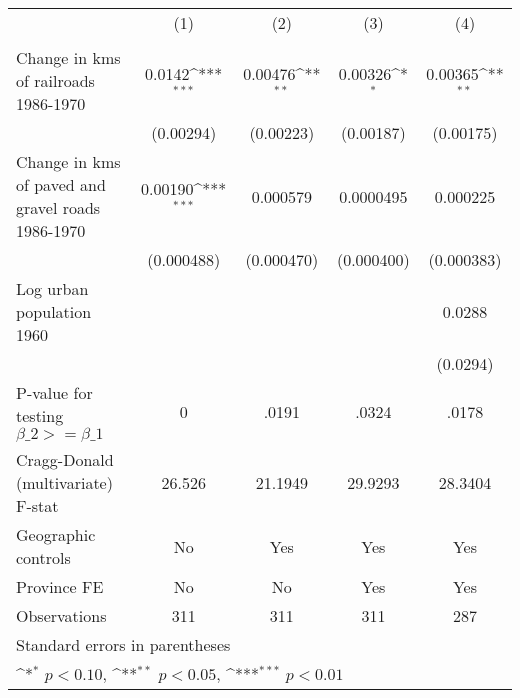 {
\def\sym#1{\ifmmode^{#1}\else\(^{#1}\)\fi}
\begin{tabular}{l*{4}{c}}
\hline\hline
                &\multicolumn{1}{c}{(1)}&\multicolumn{1}{c}{(2)}&\multicolumn{1}{c}{(3)}&\multicolumn{1}{c}{(4)}\\
                &\multicolumn{1}{c}{}&\multicolumn{1}{c}{}&\multicolumn{1}{c}{}&\multicolumn{1}{c}{}\\
\hline
Change in kms of railroads 1986-1970&   0.0142\sym{***}&  0.00476\sym{**} &  0.00326\sym{*}  &  0.00365\sym{**} \\
                &(0.00294)         &(0.00223)         &(0.00187)         &(0.00175)         \\
[1em]
Change in kms of paved and gravel roads 1986-1970&  0.00190\sym{***}& 0.000579         &0.0000495         & 0.000225         \\
                &(0.000488)         &(0.000470)         &(0.000400)         &(0.000383)         \\
[1em]
Log urban population 1960&                  &                  &                  &   0.0288         \\
                &                  &                  &                  & (0.0294)         \\
\hline
P-value for testing $\beta\_{2} >= \beta\_{1}$&        0         &    .0191         &    .0324         &    .0178         \\
Cragg-Donald (multivariate) F-stat&   26.526         &  21.1949         &  29.9293         &  28.3404         \\
Geographic controls&       No         &      Yes         &      Yes         &      Yes         \\
Province FE     &       No         &       No         &      Yes         &      Yes         \\
Observations    &      311         &      311         &      311         &      287         \\
\hline\hline
\multicolumn{5}{l}{\footnotesize Standard errors in parentheses}\\
\multicolumn{5}{l}{\footnotesize \sym{*} \(p<0.10\), \sym{**} \(p<0.05\), \sym{***} \(p<0.01\)}\\
\end{tabular}
}
